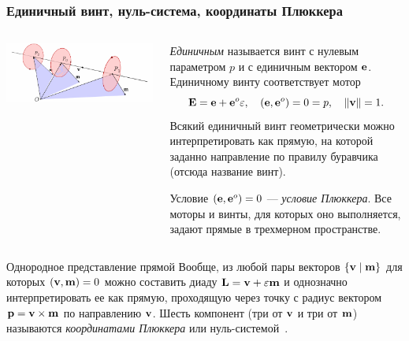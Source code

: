\begin{frame}
  \frametitle{Единичный винт, нуль-система, координаты Плюккера}
  \begin{columns}
    \begin{column}{0.5\textwidth}
      \begin{center}
        \includegraphics[width=1.0\textwidth]{img/screws/plucker}
      \end{center}
    \end{column}
    \begin{column}{0.5\textwidth}
      \emph{Единичным} называется винт с нулевым параметром $p$ и с единичным вектором $\vb{e}$. Единичному винту соответствует мотор
      \begin{equation*}
        \vb{E} = \vb{e} + \vb{e}^{o}\varepsilon,
        \quad
        (\vb{e}, \vb{e}^o) = 0 = p,
        \quad
        \norm{\vb{v}} = 1.
      \end{equation*}
      Всякий единичный винт геометрически можно интерпретировать как прямую, на которой заданно направление по правилу буравчика (отсюда название винт).

      Условие $(\vb{e}, \vb{e}^o) = 0$ — \emph{условие Плюккера}. Все моторы и винты, для которых оно выполняется, задают прямые в трехмерном пространстве.
    \end{column}
  \end{columns}

  \begin{block}{Однородное представление прямой}
    Вообще, из любой пары векторов $\{\vb{v} \mid \vb{m}\}$ для которых $(\vb{v}, \vb{m}) = 0$ можно составить диаду $\vb{L} = \vb{v} + \varepsilon \vb{m}$ и однозначно интерпретировать ее как прямую, проходящую через точку с радиус вектором $\vb{p} = \vb{v} \times \vb{m}$ по направлению $\vb{v}$. Шесть компонент (три от $\vb{v}$ и три от $\vb{m}$) называются \emph{координатами Плюккера} или нуль-системой~\cite{KleinHoherGeometrie}.
  \end{block}
\end{frame}

